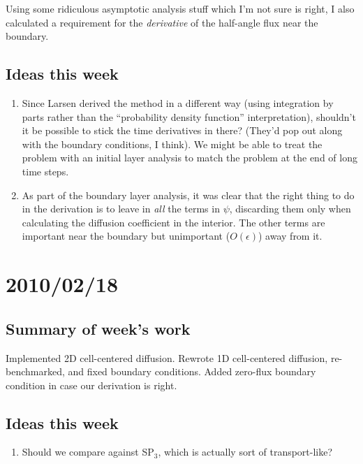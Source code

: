 \documentclass[11pt]{SRJresearch}
\begin{document}
Using some ridiculous asymptotic analysis stuff which I'm not sure is right, I
also calculated a requirement for the \emph{derivative} of the half-angle flux
near the boundary.

\subsection{Ideas this week}
\begin{enumerate}
\item 
  Since Larsen derived the method in a different way (using integration by
  parts rather than the ``probability density function'' interpretation),
  shouldn't it be possible to stick the time derivatives in there? (They'd pop
  out along with the boundary conditions, I think). We might be able to treat
  the problem with an initial layer analysis to match the problem at the end
  of long time steps.

\item
  As part of the boundary layer analysis, it was clear that the right thing to
  do in the derivation is to leave in \emph{all} the terms in $\psi$,
  discarding them only when calculating the diffusion coefficient in the
  interior. The other terms are important near the boundary but unimportant
  ($O(\epsilon)$) away from it.

\end{enumerate}

\section{2010/02/18}

\subsection{Summary of week's work}
Implemented 2D cell-centered diffusion. Rewrote 1D cell-centered diffusion,
re-benchmarked, and fixed boundary conditions. Added zero-flux boundary
condition in case our derivation is right.

\subsection{Ideas this week}
\begin{enumerate}
  \item Should we compare against SP$_3$, which is actually sort of
    transport-like?
\end{enumerate}
\end{document}
